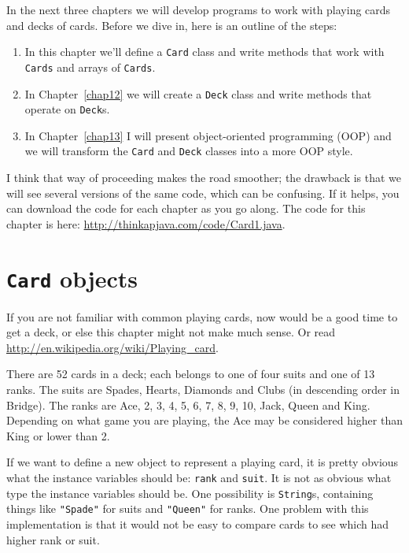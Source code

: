 \documentclass[12pt]{book}
\theoremstyle{definition}
\begin{document}
In the next three chapters we will develop programs to work with
playing cards and decks of cards.  Before we dive in, here is an
outline of the steps:

\begin{enumerate}

\item In this chapter we'll define a {\tt Card} class and write
methods that work with {\tt Cards} and arrays of {\tt Cards}.

\item In Chapter~\ref{chap12} we will create a {\tt Deck} class
and write methods that operate on {\tt Deck}s.

\item In Chapter~\ref{chap13} I will present object-oriented
programming (OOP) and we will transform the {\tt Card} and {\tt Deck}
classes into a more OOP style.

\end{enumerate}

I think that way of proceeding makes the road smoother; the drawback
is that we will see several versions of the same code, which can
be confusing.  If it helps, you can download the code for each
chapter as you go along.  The code for this chapter is here:
\url{http://thinkapjava.com/code/Card1.java}.


\section{{\tt Card} objects}
\label{card}

If you are not familiar with common playing cards, now would be a good
time to get a deck, or else this chapter might not make much sense.
Or read \url{http://en.wikipedia.org/wiki/Playing_card}.

There are 52 cards in a deck; each belongs to one of four
suits and one of 13 ranks.  The suits are Spades, Hearts, Diamonds and
Clubs (in descending order in Bridge).  The ranks are Ace, 2, 3, 4, 5,
6, 7, 8, 9, 10, Jack, Queen and King.  Depending on what game you are
playing, the Ace may be considered higher than King or lower than 2.


If we want to define a new object to represent a playing card, it is
pretty obvious what the instance variables should be: {\tt rank} and
{\tt suit}.  It is not as obvious what type the instance variables
should be.  One possibility is {\tt String}s, containing things like
{\tt "Spade"} for suits and {\tt "Queen"} for ranks.  One problem with
this implementation is that it would not be easy to compare cards to
see which had higher rank or suit.
\end{document}
